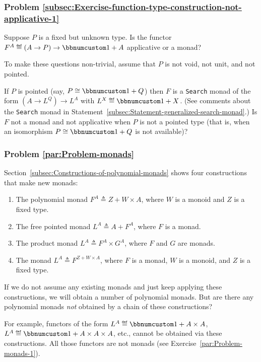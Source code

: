 \subsubsection{Problem \label{subsec:Exercise-function-type-construction-not-applicative-1}\ref{subsec:Exercise-function-type-construction-not-applicative-1}}

Suppose $P$ is a fixed but unknown type. Is the functor $F^{A}\triangleq\left(A\rightarrow P\right)\rightarrow\bbnum 1+A$
applicative or a monad?

To make these questions non-trivial, assume that $P$ is not void,
not unit, and not pointed.

If $P$ is pointed (say, $P\cong\bbnum 1+Q$) then $F$ is a \lstinline!Search!
monad of the form $(A\rightarrow L^{Q})\rightarrow L^{A}$ with $L^{X}\triangleq\bbnum 1+X$.
(See comments about the \lstinline!Search! monad in Statement~\ref{subsec:Statement-generalized-search-monad}.)
Is $F$ not a monad and not applicative when $P$ is not a pointed
type (that is, when an isomorphism $P\cong\bbnum 1+Q$ is not available)?

\subsubsection{Problem \label{par:Problem-monads}\ref{par:Problem-monads}}

Section~\ref{subsec:Constructions-of-polynomial-monads} shows four
constructions that make new monads:
\begin{enumerate}
\item The polynomial monad $F^{A}\triangleq Z+W\times A$, where $W$ is
a monoid and $Z$ is a fixed type.
\item The free pointed monad $L^{A}\triangleq A+F^{A}$, where $F$ is a
monad.
\item The product monad $L^{A}\triangleq F^{A}\times G^{A}$, where $F$
and $G$ are monads.
\item The monad $L^{A}\triangleq F^{Z+W\times A}$, where $F$ is a monad,
$W$ is a monoid, and $Z$ is a fixed type.
\end{enumerate}
If we do not assume any existing monads and just keep applying these
constructions, we will obtain a number of polynomial monads. But are
there any polynomial monads \emph{not} obtained by a chain of these
constructions?

For example, functors of the form $L^{A}\triangleq\bbnum 1+A\times A$,
$L^{A}\triangleq\bbnum 1+A\times A\times A$, etc., cannot be obtained
via these constructions. All those functors are not monads (see Exercise~\ref{par:Problem-monads-1}).

